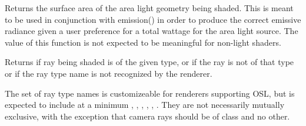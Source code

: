 \documentclass[11pt,letterpaper]{book}
\begin{document}
\apiend
\vspace{-20pt}




\apiend

Returns the surface area of the area light geometry being shaded.  This
is meant to be used in conjunction with {\cf emission()} in order to 
produce the correct emissive radiance given a user preference for a
total wattage for the area light source.  The value of this function 
is not expected to be meaningful for non-light shaders.
\apiend


Returns {} if ray being shaded is of the given type, or {} if
the ray is not of that type or if the ray type name is not recognized by
the renderer.

The set of ray type names is customizeable for renderers supporting
OSL, but is expected to include at a minimum ,
, , , ,
.  They are not necessarily mutually exclusive, with the
exception that camera rays should be of class  and no other.
\apiend
\end{document}
